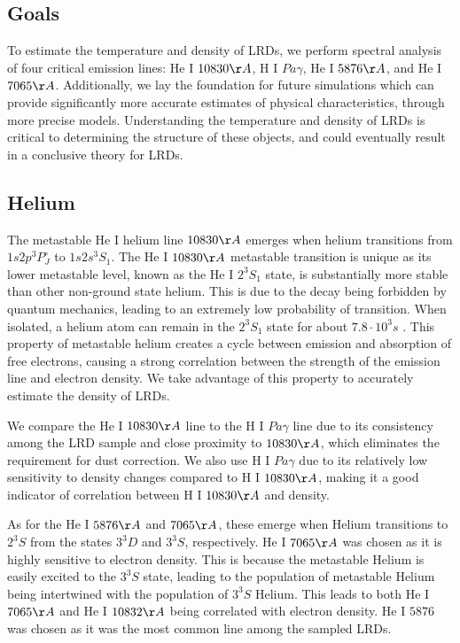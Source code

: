 \documentclass[letterpaper]{aastex701}
\begin{document}
\subsection{Goals}

To estimate the temperature and density of LRDs, we perform spectral analysis of four critical emission lines: He I $10830\AA$, H I $Pa\gamma$, He I $5876\AA$, and He I $7065\AA$. Additionally, we lay the foundation for future simulations which can provide significantly more accurate estimates of physical characteristics, through more precise models. Understanding the temperature and density of LRDs is critical to determining the structure of these objects, and could eventually result in a conclusive theory for LRDs.

\subsection{Helium}
The metastable He I helium line $10830\AA$ emerges when helium transitions from $1s2p^3P^\circ_J$ to $1s2s^3S_1$. The He I $10830\AA$ metastable transition is unique as its lower metastable level, known as the He I $2^3 S_1$ state, is substantially more stable than other non-ground state helium. This is due to the decay being forbidden by quantum mechanics, leading to an extremely low probability of transition. When isolated, a helium atom can remain in the $2^3 S_1$ state for about $7.8 \cdot 10^3s$ \citep{Sun2020-um}. This property of metastable helium creates a cycle between emission and absorption of free electrons, causing a strong correlation between the strength of the emission line and electron density. We take advantage of this property to accurately estimate the density of LRDs. 

We compare the He I $10830\AA$ line to the H I $Pa\gamma$ line due to its consistency among the LRD sample and close proximity to $10830\AA$, which eliminates the requirement for dust correction. We also use H I $Pa\gamma$ due to its relatively low sensitivity to density changes compared to H I $10830\AA$, making it a good indicator of correlation between H I $10830\AA$ and density. \citep{Aver_2015}

As for the He I $5876\AA$ and $7065\AA$, these emerge when Helium transitions to $2^3S$ from the states $3^3D$ and $3^3S$, respectively. He I $7065\AA$ was chosen as it is highly sensitive to electron density. This is because the metastable Helium is easily excited to the $3^3S$ state, leading to the population of metastable Helium being intertwined with the population of $3^3S$ Helium. This leads to both He I $7065\AA$ and He I $10832\AA$ being correlated with electron density. He I $5876$ was chosen as it was the most common line among the sampled LRDs.
\end{document}
